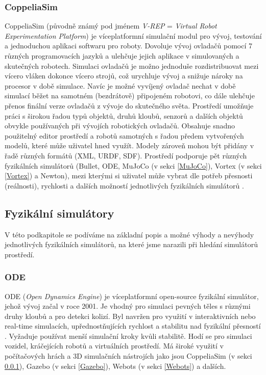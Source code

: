 \subsubsection{CoppeliaSim} \label{CoppeliaSim}
CoppeliaSim \citep{coppeliaSim} \citep{coppeliarobotics} (původně známý pod
jménem \emph{V-REP} = \emph{Virtual Robot Experimentation Platform}) je
víceplatformní simulační modul pro vývoj, testování a jednoduchou aplikaci
softwaru pro roboty. Dovoluje vývoj ovladačů pomocí 7 různých programovacích
jazyků a ulehčuje jejich aplikace v simulovaných a skutečných robotech.
Simulaci ovladačů je možno jednoduše rozdistribuovat mezi vícero vláken dokonce
vícero strojů, což urychluje vývoj a snižuje nároky na procesor v době
simulace. Navíc je možné vyvíjený ovladač nechat v době simulací běžet na
samotném (bezdrátově) připojeném robotovi, co dále ulehčuje přenos finální
verze ovladačů z vývoje do skutečného světa. Prostředí umožňuje práci s
širokou řadou typů objektů, druhů kloubů, senzorů a dalších objektů obvykle
používaných při vývojích robotických ovladačů. Obsahuje snadno použitelný
editor prostředí a robotů samotných s řadou předem vytvořených modelů, které
může uživatel hned využít. Modely zároveň mohou být přidány v řadě různých
formátů (XML, URDF, SDF). Prostředí podporuje pět různých fyzikálních
simulátorů (Bullet, ODE, MuJoCo (v sekci \ref{MuJoCo}), Vortex (v sekci
\ref{Vortex}) a Newton), mezi kterými si uživatel může vybrat dle potřeb
přesnosti (reálnosti), rychlosti a dalších možností jednotlivých fyzikálních
simulátorů \citep{nogueira2014comparative}.

\subsection{Fyzikální simulátory} \label{Fyzikální simulátory}

V této podkapitole se podíváme na základní popis a možné výhody a nevýhody
jednotlivých fyzikálních simulátorů, na které jsme narazili při hledání
simulátorů prostředí.

\subsubsection{ODE} \label{ODE}
ODE (\emph{Open Dynamics Engine}) \citep{opendynamicsengine} je víceplatformní
open-source fyzikální simulátor, jehož vývoj začal v roce 2001. Je vhodný pro
simulaci pevných těles s různými druhy kloubů a pro detekci kolizí. Byl navržen
pro využití v interaktivních nebo real-time simulacích, upřednostňujících
rychlost a stabilitu nad fyzikální přesností \citep{smith2007open}. Vyžaduje
používat menší simulační kroky kvůli stabilitě. Hodí se pro simulaci vozidel,
kráčejících robotů a virtuálních prostředí. Má široké využití v počítačových
hrách a 3D simulačních nástrojích jako jsou CoppeliaSim (v sekci
\ref{CoppeliaSim}), Gazebo (v sekci \ref{Gazebo}), Webots (v sekci
\ref{Webots}) a dalších.

